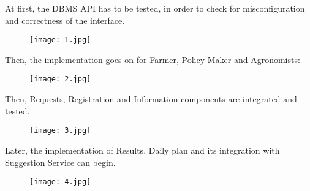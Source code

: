\documentclass[../../main.tex]{subfiles}
\begin{document}
\begin{enumerate}

	\noindent\begin{minipage}{0.9\textwidth}

	\item At first, the DBMS API has to be tested, in order to check for misconfiguration and correctness of the interface.

	\begin{figure}[H]
    \centering
    \texttt{[image: 1.jpg]}
	\end{figure}

	\end{minipage}

	\noindent\begin{minipage}{0.9\textwidth}
		
	\item  Then, the implementation goes on for Farmer, Policy Maker and Agronomists: 
	
	\begin{figure}[H]
    \centering
    \texttt{[image: 2.jpg]}
	\end{figure}

	\end{minipage}

	\noindent\begin{minipage}{0.9\textwidth}
	
	\item Then, Requests, Registration and Information components  are  integrated and tested.
	
	\begin{figure}[H]
    \centering
    \texttt{[image: 3.jpg]}
	\end{figure}

	\end{minipage}

	\noindent\begin{minipage}{0.9\textwidth}
	
	\item Later, the implementation of Results, Daily plan and its integration with Suggestion Service can begin. 

	\begin{figure}[H]
    \centering
    \texttt{[image: 4.jpg]}
	\end{figure}

	\end{minipage}

	\noindent\begin{minipage}{0.9\textwidth}
		

\end{minipage}
\end{enumerate}
\end{document}
